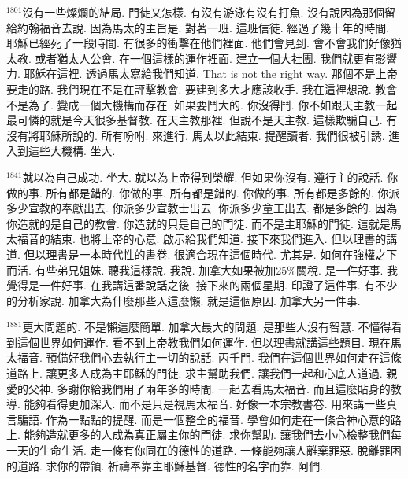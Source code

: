\documentclass{book}
\begin{document}
$^{1801}$沒有一些燦爛的結局.
門徒又怎樣.
有沒有游泳有沒有打魚.
沒有說因為那個留給約翰福音去說.
因為馬太的主旨是.
對著一班.
這班信徒.
經過了幾十年的時間.
耶穌已經死了一段時間.
有很多的衝擊在他們裡面.
他們會見到.
會不會我們好像猶太教.
或者猶太人公會.
在一個這樣的運作裡面.
建立一個大社團.
我們就更有影響力.
耶穌在這裡.
透過馬太寫給我們知道.
That is not the right way.
那個不是上帝要走的路.
我們現在不是在評擊教會.
要建到多大才應該收手.
我在這裡想說.
教會不是為了.
變成一個大機構而存在.
如果要鬥大的.
你沒得鬥.
你不如跟天主教一起.
最可憐的就是今天很多基督教.
在天主教那裡.
但說不是天主教.
這樣欺騙自己.
有沒有將耶穌所說的.
所有吩咐.
來進行.
馬太以此結束.
提醒讀者.
我們很被引誘.
進入到這些大機構.
坐大.

$^{1841}$就以為自己成功.
坐大.
就以為上帝得到榮耀.
但如果你沒有.
遵行主的說話.
你做的事.
所有都是錯的.
你做的事.
所有都是錯的.
你做的事.
所有都是多餘的.
你派多少宣教的奉獻出去.
你派多少宣教士出去.
你派多少童工出去.
都是多餘的.
因為你造就的是自己的教會.
你造就的只是自己的門徒.
而不是主耶穌的門徒.
這就是馬太福音的結束.
也將上帝的心意.
啟示給我們知道.
接下來我們進入.
但以理書的講道.
但以理書是一本時代性的書卷.
很適合現在這個時代.
尤其是.
如何在強權之下而活.
有些弟兄姐妹.
聽我這樣說.
我說.
加拿大如果被加25\%關稅.
是一件好事.
我覺得是一件好事.
在我講這番說話之後.
接下來的兩個星期.
印證了這件事.
有不少的分析家說.
加拿大為什麼那些人這麼懶.
就是這個原因.
加拿大另一件事.

$^{1881}$更大問題的.
不是懶這麼簡單.
加拿大最大的問題.
是那些人沒有智慧.
不懂得看到這個世界如何運作.
看不到上帝教我們如何運作.
但以理書就講這些題目.
現在馬太福音.
預備好我們心去執行主一切的說話.
丙千門.
我們在這個世界如何走在這條道路上.
讓更多人成為主耶穌的門徒.
求主幫助我們.
讓我們一起和心底人道過.
親愛的父神.
多謝你給我們用了兩年多的時間.
一起去看馬太福音.
而且這麼貼身的教導.
能夠看得更加深入.
而不是只是視馬太福音.
好像一本宗教書卷.
用來講一些真言騙語.
作為一點點的提醒.
而是一個整全的福音.
學會如何走在一條合神心意的路上.
能夠造就更多的人成為真正屬主你的門徒.
求你幫助.
讓我們去小心檢整我們每一天的生命生活.
走一條有你同在的德性的道路.
一條能夠讓人離棄罪惡.
脫離罪困的道路.
求你的帶領.
祈禱奉靠主耶穌基督.
德性的名字而靠.
阿們.
\newpage

\allsectionsfont{\centering}

\setlength\parindent{0pt}
\setlength{\columnsep}{1.25em}
\setlength{\parfillskip}{0pt}
\setlength{\tabcolsep}{1em}
\raggedbottom

\end{document}
